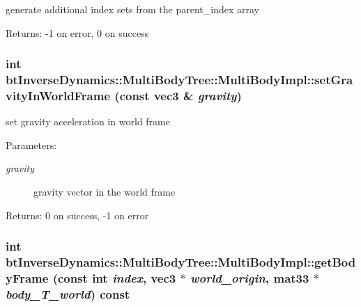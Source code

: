 generate additional index sets from the parent\_\-index array \begin{Desc}
\item[Returns:]-1 on error, 0 on success \end{Desc}
\hypertarget{classbt_inverse_dynamics_1_1_multi_body_tree_1_1_multi_body_impl_6a9262d27208b099f1753bfb34178686}{
\subsubsection[setGravityInWorldFrame]{\setlength{\rightskip}{0pt plus 5cm}int btInverseDynamics::MultiBodyTree::MultiBodyImpl::setGravityInWorldFrame (const {\bf vec3} \& {\em gravity})}}
\label{classbt_inverse_dynamics_1_1_multi_body_tree_1_1_multi_body_impl_6a9262d27208b099f1753bfb34178686}


set gravity acceleration in world frame \begin{Desc}
\item[Parameters:]
\begin{description}
\item[{\em gravity}]gravity vector in the world frame \end{description}
\end{Desc}
\begin{Desc}
\item[Returns:]0 on success, -1 on error \end{Desc}
\hypertarget{classbt_inverse_dynamics_1_1_multi_body_tree_1_1_multi_body_impl_7396d5bfe0026ae4e79a01e24f7cd708}{
\subsubsection[getBodyFrame]{\setlength{\rightskip}{0pt plus 5cm}int btInverseDynamics::MultiBodyTree::MultiBodyImpl::getBodyFrame (const int {\em index}, \/  {\bf vec3} $\ast$ {\em world\_\-origin}, \/  mat33 $\ast$ {\em body\_\-T\_\-world}) const}}
\label{classbt_inverse_dynamics_1_1_multi_body_tree_1_1_multi_body_impl_7396d5bfe0026ae4e79a01e24f7cd708}


